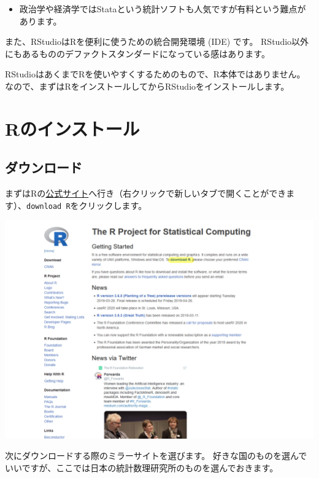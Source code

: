 \documentclass[]{bxjsreport}
\providecommand{\tightlist}{%
  \setlength{\itemsep}{0pt}\setlength{\parskip}{0pt}}
\let\asdf\section
\renewcommand{\section}{\chapter}
\let\asdff\subsection
\renewcommand{\subsection}{\asdf}
\renewcommand{\subsubsection}{\asdff}
\begin{document}
\begin{itemize}
\tightlist
\item
  政治学や経済学ではStataという統計ソフトも人気ですが有料という難点があります。
\end{itemize}

また、RStudioはRを便利に使うための統合開発環境 (IDE) です。
RStudio以外にもあるもののデファクトスタンダードになっている感はあります。

RStudioはあくまでRを使いやすくするためのもので、R本体ではありません。
なので、まずはRをインストールしてからRStudioをインストールします。

\hypertarget{rux306eux30a4ux30f3ux30b9ux30c8ux30fcux30eb}{%
\subsection{Rのインストール}\label{rux306eux30a4ux30f3ux30b9ux30c8ux30fcux30eb}}

\hypertarget{ux30c0ux30a6ux30f3ux30edux30fcux30c9}{%
\subsubsection{ダウンロード}\label{ux30c0ux30a6ux30f3ux30edux30fcux30c9}}

まずはRの\href{https://www.r-project.org/}{公式サイト}へ行き（右クリックで新しいタブで開くことができます）、\texttt{download\ R}をクリックします。

\includegraphics{figures/R1.jpg}

次にダウンロードする際のミラーサイトを選びます。
好きな国のものを選んでいいですが、ここでは日本の統計数理研究所のものを選んでおきます。
\end{document}
